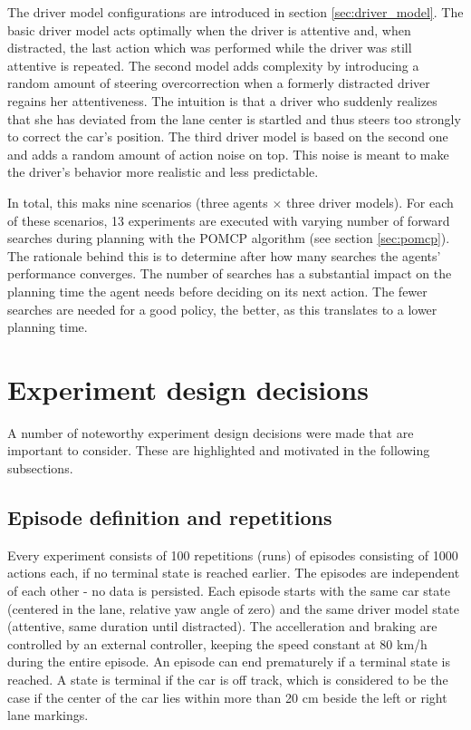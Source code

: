 The driver model configurations are introduced in section \ref{sec:driver_model}. The basic driver model acts optimally when the driver is attentive and, when distracted, the last action which was performed while the driver was still attentive is repeated. The second model adds complexity by introducing a random amount of steering overcorrection when a formerly distracted driver regains her attentiveness. The intuition is that  a driver who suddenly realizes that she has deviated from the lane center is startled and thus steers too strongly to correct the car's position. The third driver model is based on the second one and adds a random amount of action noise on top. This noise is meant to make the driver's behavior more realistic and less predictable.

In total, this maks nine scenarios (three agents $\times$ three driver models). For each of these scenarios, 13 experiments are executed with varying number of forward searches during planning with the POMCP algorithm (see section \ref{sec:pomcp}). The rationale behind this is to determine after how many searches the agents' performance converges. The number of searches has a substantial impact on the planning time the agent needs before deciding on its next action. The fewer searches are needed for a good policy, the better, as this translates to a lower planning time.

\section{Experiment design decisions}
\label{sec:design_decisions}
A number of noteworthy experiment design decisions were made that are important to consider. These are highlighted and motivated in the following subsections.

\subsection{Episode definition and repetitions}



Every experiment consists of 100 repetitions (runs) of episodes consisting of 1000 actions each, if no terminal state is reached earlier. The episodes are independent of each other - no data is persisted. Each episode starts with the same car state (centered in the lane, relative yaw angle of zero) and the same driver model state (attentive, same duration until distracted). The accelleration and braking are controlled by an external controller, keeping the speed constant at 80 km/h during the entire episode. An episode can end prematurely if a terminal state is reached. A state is terminal if the car is off track, which is considered to be the case if the center of the car lies within more than 20 cm beside the left or right lane markings.

